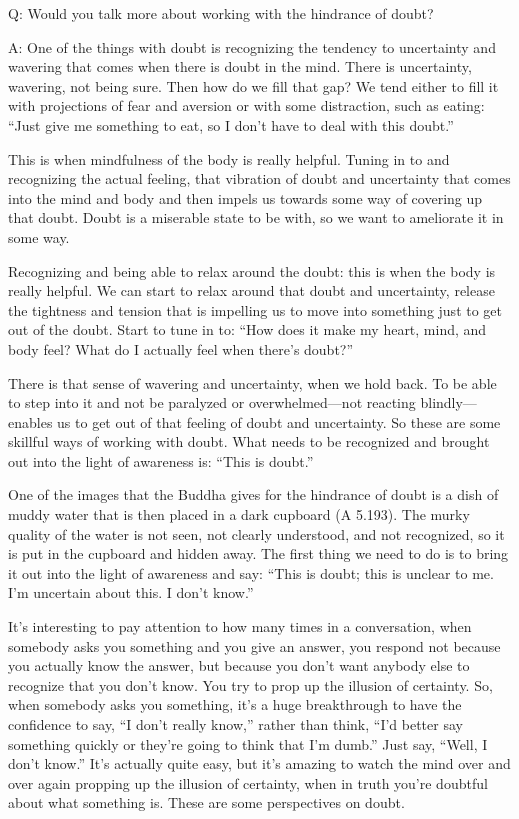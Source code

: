 \qaspace
Q: Would you talk more about working with the hindrance of doubt?

\qaspace
A: One of the things with doubt is recognizing the tendency to
uncertainty and wavering that comes when there is doubt in the mind.
There is uncertainty, wavering, not being sure. Then how do we fill that
gap? We tend either to fill it with projections of fear and aversion or
with some distraction, such as eating: “Just give me something to eat,
so I don’t have to deal with this doubt.”

This is when mindfulness of the body is really helpful. Tuning in to and
recognizing the actual feeling, that vibration of doubt and uncertainty
that comes into the mind and body and then impels us towards some way of
covering up that doubt. Doubt is a miserable state to be with, so we
want to ameliorate it in some way.

Recognizing and being able to relax around the doubt: this is when the
body is really helpful. We can start to relax around that doubt and
uncertainty, release the tightness and tension that is impelling us to
move into something just to get out of the doubt. Start to tune in to:
“How does it make my heart, mind, and body feel? What do I actually feel
when there’s doubt?”

There is that sense of wavering and uncertainty, when we hold back. To
be able to step into it and not be paralyzed or overwhelmed—not reacting
blindly—enables us to get out of that feeling of doubt and uncertainty.
So these are some skillful ways of working with doubt. What needs to be
recognized and brought out into the light of awareness is: “This is
doubt.”

One of the images that the Buddha gives for the hindrance of doubt is a
dish of muddy water that is then placed in a dark cupboard (A 5.193).
The murky quality of the water is not seen, not clearly understood, and
not recognized, so it is put in the cupboard and hidden away. The first
thing we need to do is to bring it out into the light of awareness and
say: “This is doubt; this is unclear to me. I’m uncertain about this. I
don’t know.”

It’s interesting to pay attention to how many times in a conversation,
when somebody asks you something and you give an answer, you respond not
because you actually know the answer, but because you don’t want anybody
else to recognize that you don’t know. You try to prop up the illusion
of certainty. So, when somebody asks you something, it’s a huge
breakthrough to have the confidence to say, “I don’t really know,”
rather than think, “I’d better say something quickly or they’re going to
think that I’m dumb.” Just say, “Well, I don’t know.” It’s actually
quite easy, but it’s amazing to watch the mind over and over again
propping up the illusion of certainty, when in truth you’re doubtful
about what something is. These are some perspectives on doubt.

